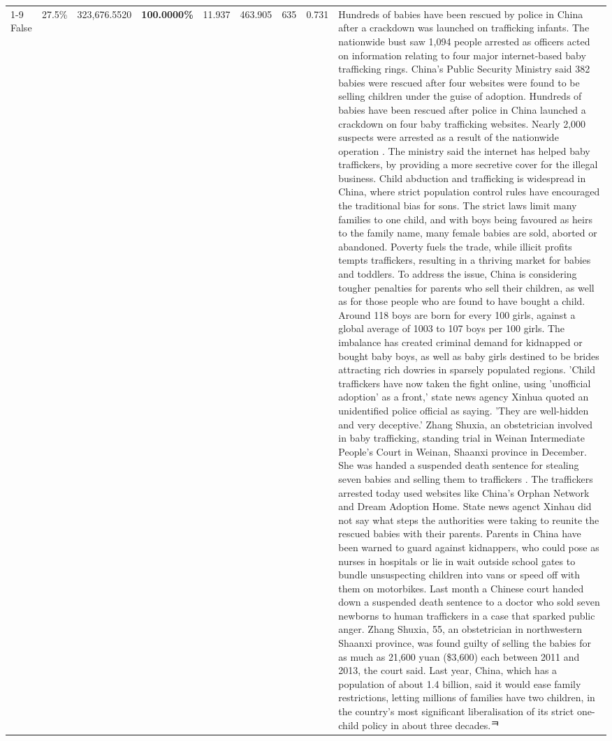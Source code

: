 \begin{table}[H]
\begin{tabular}{lllrlllll}
\cline{1-9}
False & 27.5\% & 323,676.5520 & \bfseries \color{red} 100.0000\% & 11.937 & 463.905 & 635 & 0.731 & Hundreds of babies have been rescued by police in China after a crackdown was launched on trafficking infants. The nationwide bust saw 1,094 people arrested as officers acted on information relating to four major internet-based baby trafficking rings. China's Public Security Ministry said 382 babies were rescued after four websites were found to be selling children under the guise of adoption. Hundreds of babies have been rescued after police in China launched a crackdown on four baby trafficking websites. Nearly 2,000 suspects were arrested as a result of the nationwide operation . The ministry said the internet has helped baby traffickers, by providing a more secretive cover for the illegal business. Child abduction and trafficking is widespread in China, where strict population control rules have encouraged the traditional bias for sons. The strict laws limit many families to one child, and with boys being favoured as heirs to the family name, many female babies are sold, aborted or abandoned. Poverty fuels the trade, while illicit profits tempts traffickers, resulting in a thriving market for babies and toddlers. To address the issue, China is considering tougher penalties for parents who sell their children, as well as for those people who are found to have bought a child. Around 118 boys are born for every 100 girls, against a global average of 1003 to 107 boys per 100 girls. The imbalance has created criminal demand for kidnapped or bought baby boys, as well as baby girls destined to be brides attracting rich dowries in sparsely populated regions. 'Child traffickers have now taken the fight online, using 'unofficial adoption' as a front,' state news agency Xinhua quoted an unidentified police official as saying. 'They are well-hidden and very deceptive.' Zhang Shuxia, an obstetrician involved in baby trafficking, standing trial in Weinan Intermediate People's Court in Weinan, Shaanxi province in December. She was handed a suspended death sentence for stealing seven babies and selling them to traffickers . The traffickers arrested today used websites like China's Orphan Network and Dream Adoption Home. State news agenct Xinhau did not say what steps the authorities were taking to reunite the rescued babies with their parents. Parents in China have been warned to guard against kidnappers, who could pose as nurses in hospitals or lie in wait outside school gates to bundle unsuspecting children into vans or speed off with them on motorbikes. Last month a Chinese court handed down a suspended death sentence to a doctor who sold seven newborns to human traffickers in a case that sparked public anger. Zhang Shuxia, 55, an obstetrician in northwestern Shaanxi province, was found guilty of selling the babies for as much as 21,600 yuan (\$3,600) each between 2011 and 2013, the court said. Last year, China, which has a population of about 1.4 billion, said it would ease family restrictions, letting millions of families have two children, in the country's most significant liberalisation of its strict one-child policy in about three decades.ᄏ \\

\end{tabular}
\end{table}
